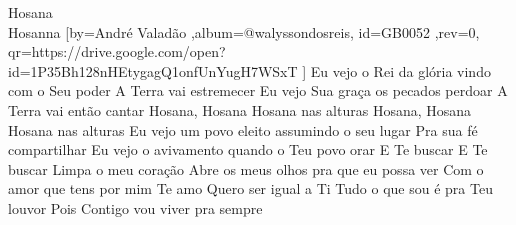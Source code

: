 \beginsong
{Hosana \\Hosanna %
}[by={André Valadão %
},album={@walyssondosreis},
id={GB0052 %
},rev={0}, %
qr={https://drive.google.com/open?id=1P35Bh128nHEtygagQ1onfUnYugH7WSxT %
}]
\beginverse*
Eu vejo o Rei da glória vindo com o Seu poder
A Terra vai estremecer
Eu vejo Sua graça os pecados perdoar
A Terra vai então cantar
\endverse
\beginchorus
Hosana, Hosana
Hosana nas alturas
Hosana, Hosana
Hosana nas alturas
\endchorus
\beginverse*
Eu vejo um povo eleito assumindo o seu lugar
Pra sua fé compartilhar
Eu vejo o avivamento quando o Teu povo orar
E Te buscar
E Te buscar
\endverse
\beginverse*
Limpa o meu coração
Abre os meus olhos pra que eu possa ver
Com o amor que tens por mim
Te amo
\endverse
\beginverse*
Quero ser igual a Ti
Tudo o que sou é pra Teu louvor
Pois Contigo vou viver pra sempre
\endverse
\vspace{4em} %
\begin{comment}
\lstset{basicstyle=\scriptsize\bf} %
\tab{Solo 1}
\begin{lstlisting}
E|-----------------------------------------------------|
B|-----------------------------------------------------|
G|-----------------------------------------------------|
D|-----------------------------------------------------|
A|-----------------------------------------------------|
E|-----------------------------------------------------|
\end{lstlisting}
\end{comment}
 
